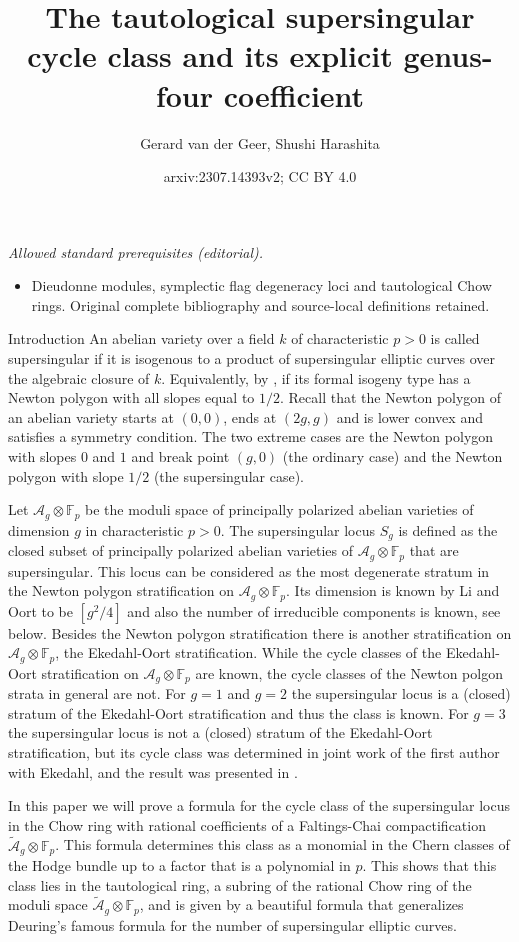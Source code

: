 \documentclass[11pt]{amsart}
\title{The tautological supersingular cycle class and its explicit genus-four coefficient}
\author{Gerard van der Geer, Shushi Harashita}
\date{arxiv:2307.14393v2; CC BY 4.0}
\numberwithin{equation}{section}
\newcommand{\FF}{\mathbb F}
\newcommand{\A}{\mathcal A}
\theoremstyle{definition}
\theoremstyle{remark}
\begin{document}
\maketitle
\noindent\textit{Allowed standard prerequisites (editorial).}\begin{itemize}
\item Dieudonne modules, symplectic flag degeneracy loci and tautological Chow rings. Original complete bibliography and source-local definitions retained.
\end{itemize}\medskip
\begin{section}{Introduction}
An abelian variety over a field $k$ of characteristic $p>0$ is called supersingular
if it is isogenous to a product of supersingular elliptic curves over
the algebraic closure of $k$. Equivalently, by \cite[Thm.\ 4.2]{Oort1974}, 
if its formal isogeny type
has a Newton polygon with all slopes equal to $1/2$.  Recall that the
Newton
polygon of an abelian variety starts at $(0,0)$, ends at $(2g,g)$ and
is lower convex and satisfies a symmetry condition. The two extreme cases
are the Newton polygon with slopes $0$ and $1$ and break point $(g,0)$ (the ordinary
case) and the Newton polygon with slope $1/2$ (the supersingular case).

Let ${\A}_g \otimes {\FF}_p$ be the moduli space of principally polarized
abelian varieties of dimension $g$ in characteristic $p>0$.
The supersingular locus $S_g$ is defined as the closed subset of principally
polarized abelian varieties of ${\A}_g\otimes {\FF}_p$ that are supersingular.
This locus can be considered as the most degenerate stratum in the Newton
polygon stratification on ${\A}_g \otimes {\FF}_p$. Its dimension is known
by Li and Oort to be $[g^2/4]$ 
and also the number of irreducible components is
known, see below. Besides the Newton polygon stratification there is another
stratification on $\mathcal{A}_g\otimes {\FF}_p$, the Ekedahl-Oort 
stratification. While the cycle classes of the Ekedahl-Oort stratification
on ${\A}_g \otimes {\FF}_p$ are known, the cycle classes of the Newton polgon
strata in general are not. For $g=1$ and $g=2$ the supersingular locus
is a (closed) stratum of the Ekedahl-Oort stratification and thus the class is known.
For $g=3$ the supersingular locus is not a (closed) 
stratum of the Ekedahl-Oort stratification, 
but its cycle class was determined in joint work of the first
author with Ekedahl, and the result was presented in \cite{vdG1}.

In this paper we will prove a formula for the cycle class of the 
supersingular locus in the Chow ring with rational coefficients
of a Faltings-Chai
compactification $\tilde{\mathcal{A}}_g\otimes {\FF}_p$.
This formula determines this class as a monomial in the
Chern classes of the Hodge bundle 
up to a factor that is a polynomial in $p$. 
This shows that this class lies in the tautological ring, a subring of the
rational Chow ring  of the moduli space
$\tilde{\mathcal{A}}_g \otimes {\FF}_p$, 
and is given by a beautiful formula
that generalizes Deuring's famous formula for the number of supersingular elliptic curves.



\end{section}
\end{document}
